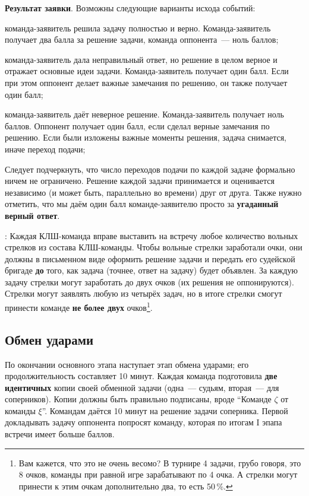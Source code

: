 \documentclass[12pt]{article}
\begin{document}
\noindent\textbf{Результат заявки}. Возможны следующие варианты исхода событий:
\begin{list}{)}{\leftmargin=6mm  \topsep=0mm  \itemsep=1pt \parsep=0mm \itemindent=10pt}
\item команда-заявитель решила задачу полностью и верно. Команда-заявитель получает два балла за решение задачи, команда оппонента~--- ноль баллов;
\item команда-заявитель дала неправильный ответ, но решение в целом верное и отражает основные идеи задачи. Команда-заявитель получает один балл. Если при этом оппонент делает важные замечания по решению, он также получает один балл;
\item команда-заявитель даёт неверное решение. Команда-заявитель получает ноль баллов. Оппонент получает один балл, если сделал верные замечания по решению. Если были изложены важные моменты решения, задача снимается, иначе переход подачи;
\end{list}
Следует подчеркнуть, что число переходов подачи по каждой задаче формально ничем не ограничено. Решение каждой задачи принимается и оценивается независимо (и может быть, параллельно во времени) друг от друга. Также нужно отметить, что мы даём один балл команде-заявителю просто за {\bf угаданный верный ответ}.

: Каждая КЛШ-команда вправе выставить на встречу любое количество вольных стрелков из состава КЛШ-команды. Чтобы вольные стрелки заработали очки, они должны в письменном виде оформить решение задачи и передать его судейской бригаде {\bf до} того, как задача (точнее, ответ на задачу) будет объявлен. За каждую задачу стрелки могут заработать до двух очков (их решения не оппонируются). Стрелки могут заявлять любую из четырёх задач, но в итоге стрелки смогут принести команде {\bf не более двух} очков\footnote{Вам кажется, что это не очень весомо? В турнире 4 задачи, грубо говоря, это 8 очков, команды при равной игре зарабатывают по 4 очка. А стрелки могут принести к этим очкам дополнительно два, то есть 50\,\%.}.

\subsection*{Обмен ударами}
По окончании основного этапа наступает этап обмена ударами; его продолжительность составляет 10 минут. Каждая команда подготовила {\bf две идентичных} копии своей обменной задачи (одна~--- судьям, вторая~--- для соперников). Копии должны быть правильно подписаны, вроде ``Команде $\zeta$ от команды $\xi$''. Командам даётся 10 минут на решение задачи соперника. Первой докладывать задачу оппонента попросят команду, которая по итогам I эпапа встречи имеет больше баллов.
\end{document}
